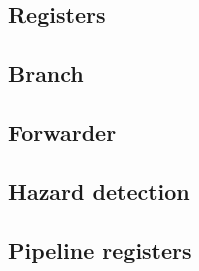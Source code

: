 \subsection{Registers}

\subsection{Branch}

\subsection{Forwarder}
\label{section:Forwarder}

\subsection{Hazard detection}

\subsection{Pipeline registers}
